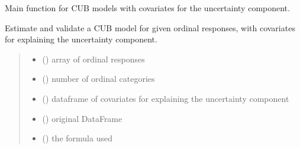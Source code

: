 \documentclass[letterpaper,10pt,english]{sphinxmanual}
\begin{document}

\begin{fulllineitems}
\label{\detokenize{cubmods:cubmods.cub_y0.mle}}
\pysigstartsignatures
{}
\pysigstopsignatures
\sphinxAtStartPar
Main function for CUB models with covariates for the uncertainty component.

\sphinxAtStartPar
Estimate and validate a CUB model for given ordinal responses, with covariates for explaining 
the uncertainty component.
\begin{quote}\begin{description}
\begin{itemize}
\item {} 
\sphinxAtStartPar
{} () \textendash{} array of ordinal responses

\item {} 
\sphinxAtStartPar
{} () \textendash{} number of ordinal categories

\item {} 
\sphinxAtStartPar
{} () \textendash{} dataframe of covariates for explaining the uncertainty component

\item {} 
\sphinxAtStartPar
{} () \textendash{} original DataFrame

\item {} 
\sphinxAtStartPar
{} () \textendash{} the formula used


\end{itemize}
\end{description}
\end{quote}
\end{fulllineitems}
\end{document}
